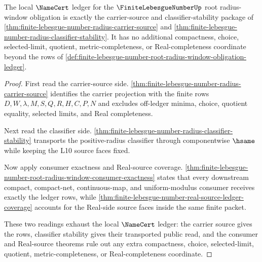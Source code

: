 \begin{theorem}
\label{thm:finite-lebesgue-number-radius-ledger-exactness}
The local $\NameCert$ ledger for the $\FiniteLebesgueNumberUp$ root radius-window obligation is exactly the carrier-source and classifier-stability package of \autoref{thm:finite-lebesgue-number-radius-carrier-source} and \autoref{thm:finite-lebesgue-number-radius-classifier-stability}. It has no additional compactness, choice, selected-limit, quotient, metric-completeness, or Real-completeness coordinate beyond the rows of \autoref{def:finite-lebesgue-number-root-radius-window-obligation-ledger}.
\end{theorem}
\begin{proof}
First read the carrier-source side. \autoref{thm:finite-lebesgue-number-radius-carrier-source} identifies the carrier projection with the finite rows $D,W,\lambda,M,S,Q,R,H,C,P,N$ and excludes off-ledger minima, choice, quotient equality, selected limits, and Real completeness.

Next read the classifier side. \autoref{thm:finite-lebesgue-number-radius-classifier-stability} transports the positive-radius classifier through componentwise $\hsame$ while keeping the L10 source faces fixed.

Now apply consumer exactness and Real-source coverage. \autoref{thm:finite-lebesgue-number-root-radius-window-consumer-exactness} states that every downstream compact, compact-net, continuous-map, and uniform-modulus consumer receives exactly the ledger rows, while \autoref{thm:finite-lebesgue-number-real-source-ledger-coverage} accounts for the Real-side source faces inside the same finite packet.

These two readings exhaust the local $\NameCert$ ledger: the carrier source gives the rows, classifier stability gives their transported public read, and the consumer and Real-source theorems rule out any extra compactness, choice, selected-limit, quotient, metric-completeness, or Real-completeness coordinate.
\end{proof}

